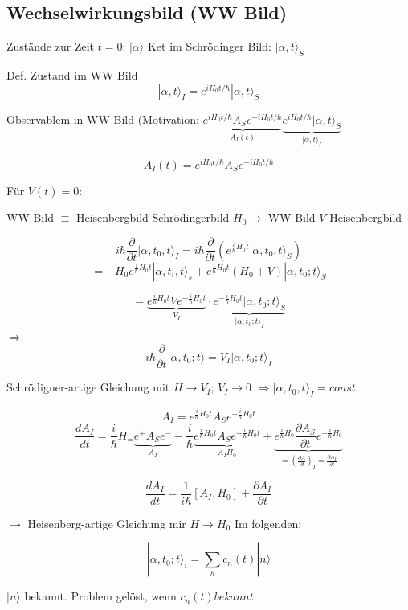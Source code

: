 \subsection{Wechselwirkungsbild (WW Bild)}

Zustände zur Zeit \(t=0\): \(|\alpha\rangle\) Ket im Schrödinger Bild: \(|\alpha,t\rangle_S\)

Def. Zustand im WW Bild
\[ |\alpha,t\rangle_I = e^{iH_0t/\hbar}|\alpha,t\rangle_S\]

Observablem in WW Bild (Motivation: \(\underbrace{e^{iH_0t/\hbar} A_S e^{-iH_0t/\hbar}}_{A_I(t)} \underbrace{e^{iH_0t/\hbar}|\alpha,t\rangle_S}_{|\alpha,t\rangle_I}\)

\[ A_I(t) =  e^{iH_0t/\hbar} A_S e^{-iH_0t/\hbar} \]

Für \(V(t)=0\):

WW-Bild \(\equiv\) Heisenbergbild Schrödingerbild \(H_0\rightarrow\) WW Bild \(V\) Heisenbergbild

\[ i\hbar \frac{\partial}{\partial t}|\alpha,t_0,t\rangle_I = i\hbar \frac{\partial}{\partial t}(e^{\frac{i}{\hbar}H_0t}|\alpha,t_0,t\rangle_S)\]
\[ = -H_0 e^{\frac{i}{\hbar}H_0 t}|\alpha,t_i,t\rangle_s + e^{\frac{i}{\hbar}H_0t}(H_0+V)|\alpha,t_0;t\rangle_S\]


\[ = \underbrace{e^{\frac{i}{\hbar}H_0t}Ve^{-\frac{i}{\hbar}H_0t}}_{V_I}\cdot \underbrace{e^{-\frac{i}{\hbar}H_0t}|\alpha,t_0;t\rangle_S}_{|\alpha,t_0;t\rangle_I}\]
\(\Rightarrow\) \[\boxed{i\hbar \frac{\partial}{\partial t} |\alpha,t_0;t\rangle = V_I|\alpha,t_0;t\rangle_I}\]

Schrödigner-artige Gleichung mit \(H\rightarrow V_I\); \(V_I\rightarrow 0\) \(\Rightarrow |\alpha,t_0,t\rangle_I=const.\)

\[A_I = e^{\frac{i}{\hbar}H_0t}A_Se^{-\frac{i}{\hbar}H_0t}\]
\[\frac{dA_I}{dt} = \frac{i}{\hbar} H_= \underbrace{e^+ A_S e^-}_{A_I} -  \frac{i}{\hbar} \underbrace{e^{\frac{i}{\hbar}H_0t}A_Se^{-\frac{i}{\hbar}H_0t}}_{A_I H_0}+\underbrace{e^{\frac{i}{\hbar}H_0} \frac{\partial A_S}{\partial t} e^{-\frac{i}{\hbar}H_0}}_{=\left(\frac{\partial A}{\partial t}\right)_I=\frac{\partial A_I}{\partial t}}\]

\[\frac{dA_I}{dt} = \frac{1}{i\hbar}[A_I,H_0]+ \frac{\partial A_I}{\partial t}\]

\(\rightarrow\) Heisenberg-artige Gleichung mir \(H\rightarrow H_0\) Im folgenden:

\[ |\alpha,t_0;t\rangle_i = \sum_h c_n(t)|n\rangle\]

\(|n\rangle\) bekannt. Problem gelöst, wenn \(c_n(t) bekannt\)

